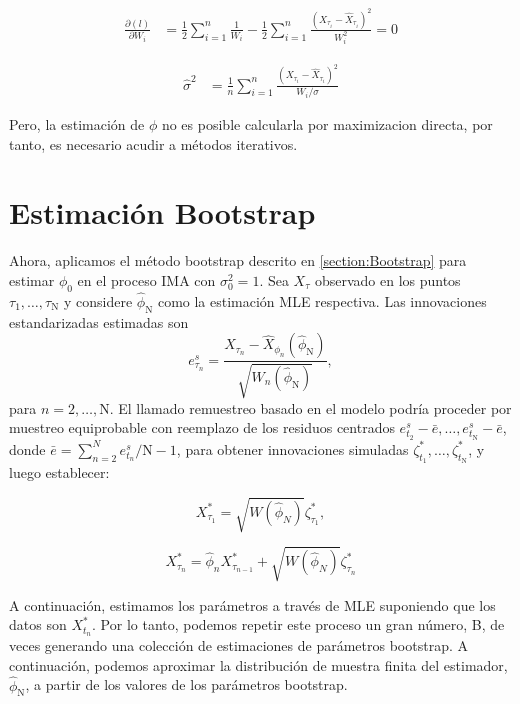 \begin{equation}
   \begin{split}
   \frac{\partial(l)}{\partial W_i} &= \frac{1}{2}\sum_{i=1}^{n}\frac{1}{W_i} - \frac{1}{2}\sum_{i=1}^{n}\frac{\left( X_{\tau_i} - \hat{X}_{\tau_i}\right)^2}{W_i^2} = 0
   \end{split}
\end{equation}

\begin{equation}
   \begin{split}
   \hat{\sigma}^2 &= \frac{1}{n}\sum_{i=1}^{n}\frac{\left( X_{\tau_i} - \hat{X}_{\tau_i}\right)^2}{W_i/\sigma}
   \end{split}
\end{equation}

Pero, la estimación de $\phi$ no es posible calcularla por maximizacion directa, por tanto, es necesario acudir a métodos
iterativos.
\section{Estimación Bootstrap}

Ahora, aplicamos el método bootstrap descrito en \ref{section:Bootstrap} para estimar $\phi_0$ 
en el proceso IMA con $\sigma_0^2=1$. Sea $X_\tau$ observado en los puntos $\tau_1, \ldots, \tau_{\mathrm{N}}$ y 
considere $\hat{\phi}_{\mathrm{N}}$ como la estimación MLE respectiva. Las innovaciones estandarizadas estimadas son
$$
e_{\tau_n}^s=\frac{X_{\tau_n}-\hat{X}_{\phi_n}\left(\hat{\phi}_{\mathrm{N}}\right)}{\sqrt{W_n\left(\hat{\phi}_{\mathrm{N}}\right)}},
$$
para $n=2, \ldots, \mathrm{N}$. El llamado remuestreo basado en el modelo podría proceder por muestreo equiprobable 
con reemplazo de los residuos centrados $e_{t_2}^s-\bar{e}, \ldots, e_{t_{\mathrm{N}}}^s-\bar{e}$, donde $\bar{e}=\sum_{n=2}^N e_{t_n}^s / \mathrm{N}-1$,
para obtener innovaciones simuladas $\zeta_{t_1}^*, \ldots, \zeta_{t_{\mathrm{N}}}^*$, y luego establecer:

\begin{equation}
    X_{\tau_1}^* = \sqrt{W(\hat{\phi}_N)}\zeta_{\tau_1}^*, 
\end{equation}

\begin{equation}
    X_{\tau_n}^* = \hat{\phi}_{n}X_{\tau_{n-1}}^* + \sqrt{W(\hat{\phi}_N)}\zeta_{\tau_n}^*
\end{equation}

A continuación, estimamos los parámetros a través de MLE suponiendo que los datos son $X_{t_n}^*$. Por lo tanto, podemos repetir este proceso un gran número, B, de veces generando una colección de estimaciones de parámetros bootstrap. A continuación, podemos aproximar la distribución de muestra finita del estimador, $ {\hat{\phi}_{\mathrm{N}}}$, a partir de los valores de los parámetros bootstrap.

